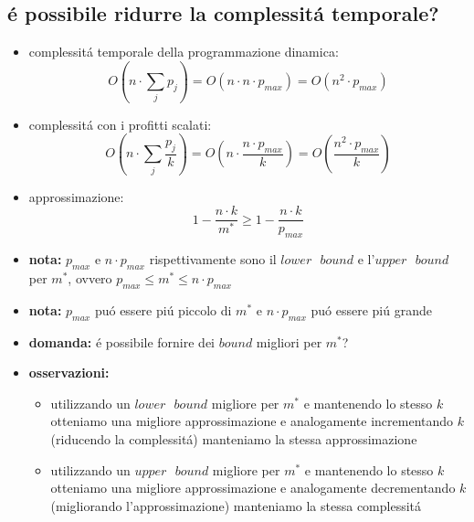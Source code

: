 
\subsection*{\'e possibile ridurre la complessit\'a temporale?}
\begin{flushleft}
	\begin{itemize}
		\item complessit\'a temporale della programmazione dinamica:
			$$O(n\cdot\sum_{j}p_j)=O(n\cdot n\cdot p_{max})=O(n^2\cdot p_{max})$$
		\item complessit\'a con i profitti scalati:
			$$O(n\cdot\sum_{j}\frac{p_j}{k})=O(n\cdot\frac{n\cdot p_{max}}{k})=O(\frac{n^2\cdot p_{max}}{k})$$
		\item approssimazione:
			$$1-\frac{n\cdot k}{m^*}\geq 1-\frac{n\cdot k}{p_{max}}$$
		\item \textbf{nota:} $p_{max}$ e $n\cdot p_{max}$ rispettivamente sono il $lower\text{ }bound$ e l'$upper\text{ }bound$ per $m^*$, ovvero $p_{max}\leq m^*\leq n\cdot p_{max}$
		\item \textbf{nota:} $p_{max}$ pu\'o essere pi\'u piccolo di $m^*$ e $n\cdot p_{max}$ pu\'o essere pi\'u grande
		\item \textbf{domanda:} \'e possibile fornire dei $bound$ migliori per $m^*$?
		\item \textbf{osservazioni:}
		\begin{itemize}
			\item utilizzando un $lower\text{ }bound$ migliore per $m^*$ e mantenendo lo stesso $k$ otteniamo una migliore approssimazione e analogamente incrementando $k$ (riducendo la complessit\'a) manteniamo la stessa approssimazione
			\item utilizzando un $upper\text{ }bound$ migliore per $m^*$ e mantenendo lo stesso $k$ otteniamo una migliore approssimazione e analogamente decrementando $k$ (migliorando l'approssimazione) manteniamo la stessa complessit\'a
		\end{itemize}
	\end{itemize}
\end{flushleft}


